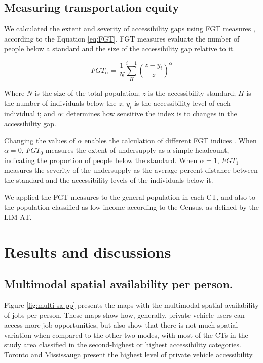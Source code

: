 \documentclass[preprint, 3p,
authoryear]{elsarticle} %
\begin{document}
\subsection{Measuring transportation
equity}\label{measuring-transportation-equity}

We calculated the extent and severity of accessibility gaps using FGT
measures \citep{foster2010}, according to the Equation \ref{eq:FGT}. FGT
measures evaluate the number of people below a standard and the size of
the accessibility gap relative to it.

\begin{equation}
\label{eq:FGT}
FGT_\alpha = \frac{1}{N}\sum_{H}^{i=1}\left(\frac{z-y_i}{z}  \right)^{\alpha}
\end{equation}

Where \(N\) is the size of the total population; \(z\) is the
accessibility standard; \(H\) is the number of individuals below the
\(z\); \(y_i\) is the accessibility level of each individual i; and
\(\alpha\): determines how sensitive the index is to changes in the
accessibility gap.

Changing the values of \(\alpha\) enables the calculation of different
FGT indices \citep{karner2024}. When \(\alpha = 0\), \(FGT_0\) measures
the extent of undersupply as a simple headcount, indicating the
proportion of people below the standard. When \(\alpha = 1\), \(FGT_1\)
measures the severity of the undersupply as the average percent distance
between the standard and the accessibility levels of the individuals
below it.

We applied the FGT measures to the general population in each CT, and
also to the population classified as low-income according to the Census,
as defined by the LIM-AT.

\section{Results and discussions}\label{results-and-discussions}

\subsection{Multimodal spatial availability per
person.}\label{multimodal-spatial-availability-per-person.}

Figure \ref{fig:multi-sa-pp} presents the maps with the multimodal
spatial availability of jobs per person. These maps show how, generally,
private vehicle users can access more job opportunities, but also show
that there is not much spatial variation when compared to the other two
modes, with most of the CTs in the study area classified in the
second-highest or highest accessibility categories. Toronto and
Mississauga present the highest level of private vehicle accessibility.
\end{document}
